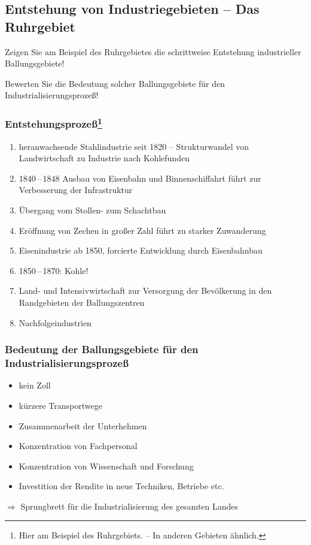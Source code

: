 
\subsection{Entstehung von Industriegebieten -- Das Ruhrgebiet}

\begin{aufgabe}
Zeigen Sie am Beispiel des Ruhrgebietes die schrittweise Entstehung
industrieller Ballungsgebiete!

Bewerten Sie die Bedeutung solcher Ballungsgebiete für den
Industrialisierungsprozeß!
\end{aufgabe}

\subsubsection[Entstehungsprozeß]{Entstehungsprozeß\footnote{Hier am
Beispiel des Ruhrgebiets. -- In anderen Gebieten ähnlich.}}

\begin{enumerate}
\item heranwachsende Stahlindustrie seit 1820 -- Strukturwandel von
Landwirtschaft zu Industrie nach Kohlefunden
\item 1840\,--\,1848 Ausbau von Eisenbahn und Binnenschiffahrt führt
zur Verbesserung der Infrastruktur
\item Übergang vom Stollen- zum Schachtbau
\item Eröffnung von Zechen in großer Zahl führt zu starker Zuwanderung
\item Eisenindustrie ab 1850, forcierte Entwicklung durch Eisenbahnbau
\item 1850\,--\,1870: Kohle!
\item Land- und Intensivwirtschaft zur Versorgung der Bevölkerung in
den Randgebieten der Ballungszentren
\item Nachfolgeindustrien
\end{enumerate}

\subsubsection{Bedeutung der Ballungsgebiete für den
Industrialisierungsprozeß}

\begin{itemize}
\item kein Zoll
\item kürzere Transportwege
\item Zusammenarbeit der Unterhehmen
\item Konzentration von Fachpersonal
\item Konzentration von Wissenschaft und Forschung
\item Investition der Rendite in neue Techniken, Betriebe etc.
\end{itemize}

$\Longrightarrow$ Sprungbrett für die Industrialisierung des gesamten
Landes

\endinput
